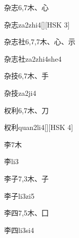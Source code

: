 \begin{entry}{杂志}{6,7}{⽊、⼼}
  \begin{phonetics}{杂志}{za2zhi4}[][HSK 3]
  \end{phonetics}
\end{entry}

\begin{entry}{杂志社}{6,7,7}{⽊、⼼、⽰}
  \begin{phonetics}{杂志社}{za2zhi4she4}
  \end{phonetics}
\end{entry}

\begin{entry}{杂技}{6,7}{⽊、⼿}
  \begin{phonetics}{杂技}{za2ji4}
  \end{phonetics}
\end{entry}

\begin{entry}{权利}{6,7}{⽊、⼑}
  \begin{phonetics}{权利}{quan2li4}[][HSK 4]
  \end{phonetics}
\end{entry}

\begin{entry}{李}{7}{⽊}
  \begin{phonetics}{李}{li3}
  \end{phonetics}
\end{entry}

\begin{entry}{李子}{7,3}{⽊、⼦}
  \begin{phonetics}{李子}{li3zi5}
  \end{phonetics}
\end{entry}

\begin{entry}{李四}{7,5}{⽊、⼞}
  \begin{phonetics}{李四}{li3si4}
  \end{phonetics}
\end{entry}

